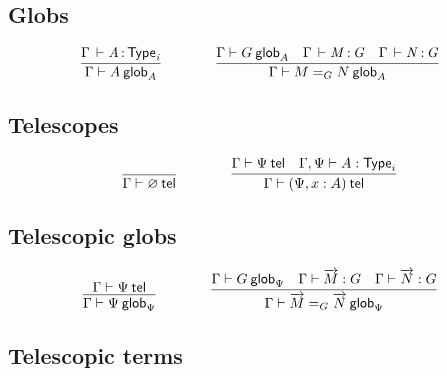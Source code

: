 
\subsection{Globs}




\begin{small}
  \[
  \infer{\wfglob{\Gamma}{A}{A}}
  {\oftp{\Gamma}{A}{\typ{i}}}
  \qquad\qquad
  \infer{\wfglob{\Gamma}{\homj{G}{M}{N}}{A}}
  {\wfglob{\Gamma}{G}{A} &
    \oftp{\Gamma}{M}{G} &
    \oftp{\Gamma}{N}{G}
  }
  \]
\end{small}

\subsection{Telescopes}

\begin{small}
  \[
  \infer{\wftel{\Gamma}{\varnothing}}{}
  \qquad\qquad
  \infer{\wftel{\Gamma}{(\Psi,x:A)}}
  {\wftel{\Gamma}{\Psi}
    & \wftype{\Gamma,\Psi}{A}}
  \]
\end{small}

\subsection{Telescopic globs}

\begin{small}
  \[
  \infer{\wfglob{\Gamma}{\Psi}{\Psi}}
  {\wftel{\Gamma}{\Psi}}
  \qquad\qquad
  \infer{\wfglob{\Gamma}{\homj{G}{\tel{M}}{\tel{N}}}{\Psi}}
  {\wfglob{\Gamma}{G}{\Psi}
    & \ofglob{\Gamma}{\tel{M}}{G}
    & \ofglob{\Gamma}{\tel{N}}{G}}
  \]
\end{small}

\subsection{Telescopic terms}

